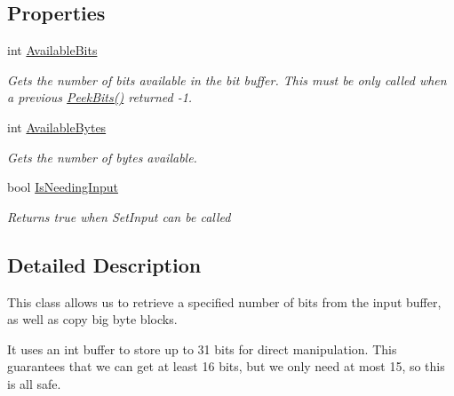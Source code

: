 \subsection*{Properties}
\begin{DoxyCompactItemize}
\item 
int \hyperlink{class_i_c_sharp_code_1_1_sharp_zip_lib_1_1_zip_1_1_compression_1_1_streams_1_1_stream_manipulator_a1ff254ed1ef5997b313db4b06204c6ba}{Available\+Bits}
\begin{DoxyCompactList}\small\item\em Gets the number of bits available in the bit buffer. This must be only called when a previous \hyperlink{class_i_c_sharp_code_1_1_sharp_zip_lib_1_1_zip_1_1_compression_1_1_streams_1_1_stream_manipulator_acffdc659e2508d7642be37f3c0fa1ec0}{Peek\+Bits()} returned -\/1. \end{DoxyCompactList}\item 
int \hyperlink{class_i_c_sharp_code_1_1_sharp_zip_lib_1_1_zip_1_1_compression_1_1_streams_1_1_stream_manipulator_a7da2bc19cc20ef6c2de90e7b7bc32287}{Available\+Bytes}
\begin{DoxyCompactList}\small\item\em Gets the number of bytes available. \end{DoxyCompactList}\item 
bool \hyperlink{class_i_c_sharp_code_1_1_sharp_zip_lib_1_1_zip_1_1_compression_1_1_streams_1_1_stream_manipulator_abdc52ea538c6b83aeca7d0868ed52873}{Is\+Needing\+Input}
\begin{DoxyCompactList}\small\item\em Returns true when Set\+Input can be called \end{DoxyCompactList}\end{DoxyCompactItemize}


\subsection{Detailed Description}
This class allows us to retrieve a specified number of bits from the input buffer, as well as copy big byte blocks. 

It uses an int buffer to store up to 31 bits for direct manipulation. This guarantees that we can get at least 16 bits, but we only need at most 15, so this is all safe.

